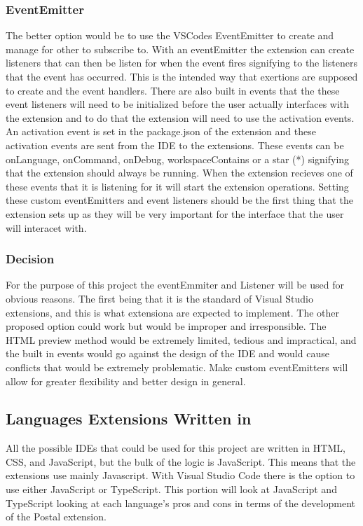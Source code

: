 \documentclass[letterpaper,10pt,titlepage,draftclsnofoot,onecolumn,onesided] {IEEEtran}
\begin{document}
\subsubsection{EventEmitter}
The better option would be to use the VSCodes EventEmitter to create and manage for other to subscribe to. 
With an eventEmitter the extension can create listeners that can then be listen for when the event fires signifying to the listeners that the event has occurred. 
This is the intended way that exertions are supposed to create and the event handlers. 
There are also built in events that the these event listeners will need to be initialized before the user actually interfaces with the extension and to do that the extension will need to use the activation events. 
An activation event is set in the package.json of the extension and these activation events are sent from the IDE to the extensions.
These events can be onLanguage, onCommand, onDebug, workspaceContains or a star (*) signifying that the extension should always be running. 
When the extension recieves one of these events that it is listening for it will start the extension operations. 
Setting these custom eventEmitters and event listeners should be the first thing that the extension sets up as they will be very important for the interface that the user will interacet with. \cite{VSCodeDocumentation}

\subsubsection{Decision}
For the purpose of this project the eventEmmiter and Listener will be used for obvious reasons. 
The first being that it is the standard of Visual Studio extensions, and this is what extensiona are expected to implement. 
The other proposed option could work but would be improper and irresponsible.
The HTML preview method would be extremely limited, tedious and impractical, and the built in events would go against the design of the IDE and would cause conflicts that would be extremely problematic.
Make custom eventEmitters will allow for greater flexibility and better design in general. 

\subsection{Languages Extensions Written in}
All the possible IDEs that could be used for this project are written in HTML, CSS, and JavaScript, but the bulk of the logic is JavaScript. 
This means that the extensions use mainly Javascript. 
With Visual Studio Code there is the option to use either JavaScript or TypeScript. 
This portion will look at JavaScript and TypeScript looking at each language's pros and cons in terms of the development of the Postal extension.
\end{document}
